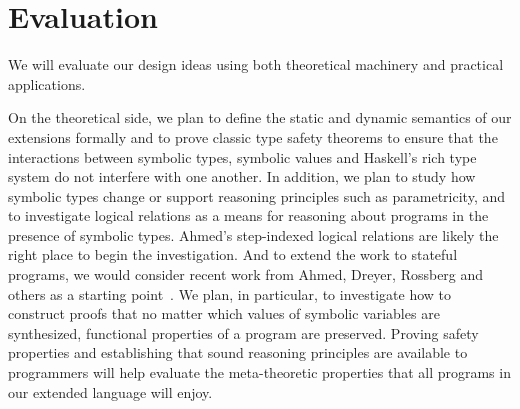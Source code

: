 











\section{Evaluation}
\label{sec:eval}

We will evaluate our design ideas using both theoretical machinery and
practical applications.

On the theoretical side, we plan to define the 
static and dynamic semantics of our extensions formally and 
to prove classic type safety theorems to ensure that the interactions
between symbolic types, symbolic values and Haskell's rich type system
do not interfere with one another.  In addition, we plan to study
how symbolic types change or support reasoning principles such as
parametricity, and to investigate logical relations as a means
for reasoning about programs in the presence of symbolic types.  
Ahmed's step-indexed logical relations are likely the right place
to begin the investigation.  And to extend the work to stateful programs,
we would consider recent work from Ahmed, Dreyer, Rossberg and others 
as a starting
point~\cite{Ahmed:state-logical-relations,Dreyer:logical-relations}.
We plan, in particular, to investigate how to construct proofs that
no matter which values of symbolic variables are synthesized, functional
properties of a program are preserved.
Proving safety properties and establishing that sound reasoning principles
are available to programmers will help evaluate the meta-theoretic
properties that all programs in our extended language will enjoy.

